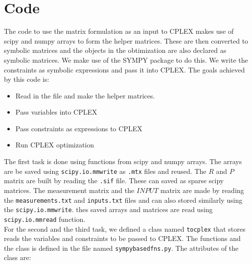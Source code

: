 \documentclass[
10pt, %
letter, %
oneside, %
BCOR02mm, %
]{scrartcl}
\begin{document}
\section{Code}
The code to use the matrix formulation as an input to CPLEX \cite{cplex} makes use of scipy and numpy arrays \cite{SCINUM}  to form the helper matrices. These are then converted to symbolic matrices and the objects in the obtimization are also declared as symbolic matrices. We make use of the SYMPY package \cite{Sympy} to do this. We write the constraints as symbolic expressions and pass it into CPLEX. 
The goals achieved by this code is: 
\begin{itemize}
\item Read in the file and make the helper matrices. 
\item Pass variables into CPLEX
\item Pass constraints as expressions to CPLEX
\item Run CPLEX optimization
\end{itemize}
The first task is done using functions from scipy and numpy arrays. The arrays are be saved using \verb;scipy.io.mmwrite; as \verb;.mtx; files and reused. The $R$ and $P$ matrix are built by reading the \verb;.sif; file. 
These can saved as sparse scipy matrices. The measurement matrix and the $INPUT$ matrix are made by reading the \verb;measurements.txt; and \verb;inputs.txt; files and can also stored similarly using the \verb;scipy.io.mmwrite;. thes saved arrays and matrices are read using \verb;scipy.io.mmread; function. 
\\
For the second and the third task, we defined a class named \verb;tocplex; that stores reads the variables and constraints to be passed to CPLEX. The functions and the class is defined in the file named \verb;sympybasedfns.py;. The attributes of the class are:
\end{document}
